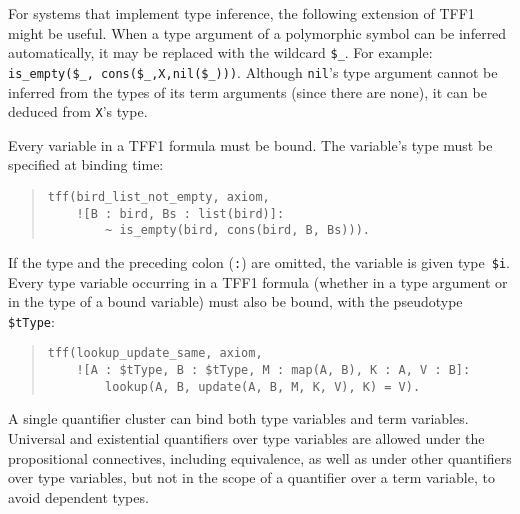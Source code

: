 For systems that implement type inference, the following %
extension of TFF1 might be useful. When a type argument of
a polymorphic symbol can be inferred automatically, it may be
replaced with the wildcard {\tt \$\_}. For example:
{\tt is\_empty(\$\_,\allowbreak\;\,cons(\$\_,\allowbreak\;X,\;nil(\$\_)))}.
Although {\tt nil}'s type argument cannot be inferred from the types of
its term arguments (since there are none), it can be
deduced from {\texttt X}'s type.

Every variable in a TFF1 formula must be bound. The variable's type must be specified
at binding time:
\begin{quote}
\begin{verbatim}
tff(bird_list_not_empty, axiom,
    ![B : bird, Bs : list(bird)]:
        ~ is_empty(bird, cons(bird, B, Bs))).
\end{verbatim}
\end{quote}

\pagebreak[3] %

If the type and the preceding colon ({\tt :}) are omitted, the variable is given
type~{\tt\$i}. Every type variable occurring in a TFF1 formula
(whether in a type argument or in the type of a bound variable)
must also be bound, with the pseudotype {\tt\$tType}:
\begin{quote}
\begin{verbatim}
tff(lookup_update_same, axiom,
    ![A : $tType, B : $tType, M : map(A, B), K : A, V : B]:
        lookup(A, B, update(A, B, M, K, V), K) = V).
\end{verbatim}
\end{quote}

A single quantifier cluster can bind both type variables and term variables.
Universal and existential quantifiers over type variables are allowed under the
propositional connectives, including equivalence, as well as under other
quantifiers over type variables, but not in the scope of a quantifier over a
term variable, to avoid dependent types.

